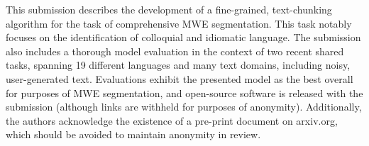 This submission describes the development of a fine-grained, text-chunking algorithm for the task of comprehensive MWE segmentation. This task notably focuses on the identification of colloquial and idiomatic language. The submission also includes a thorough model evaluation in the context of two recent shared tasks, spanning 19 different languages and many text domains, including noisy, user-generated text. Evaluations exhibit the presented model as the best overall for purposes of MWE segmentation, and open-source software is released with the submission (although links are withheld for purposes of anonymity). Additionally, the authors acknowledge the existence of a pre-print document on arxiv.org, which should be avoided to maintain anonymity in review.
